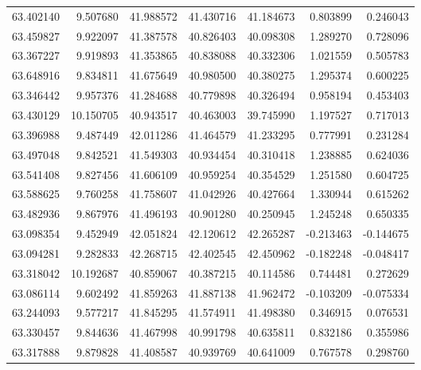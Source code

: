\begin{tabular}{rrrrrrr}
 63.402140 &   9.507680 &         41.988572 &         41.430716 &         41.184673 &  0.803899 &  0.246043 \\
 63.459827 &   9.922097 &         41.387578 &         40.826403 &         40.098308 &  1.289270 &  0.728096 \\
 63.367227 &   9.919893 &         41.353865 &         40.838088 &         40.332306 &  1.021559 &  0.505783 \\
 63.648916 &   9.834811 &         41.675649 &         40.980500 &         40.380275 &  1.295374 &  0.600225 \\
 63.346442 &   9.957376 &         41.284688 &         40.779898 &         40.326494 &  0.958194 &  0.453403 \\
 63.430129 &  10.150705 &         40.943517 &         40.463003 &         39.745990 &  1.197527 &  0.717013 \\
 63.396988 &   9.487449 &         42.011286 &         41.464579 &         41.233295 &  0.777991 &  0.231284 \\
 63.497048 &   9.842521 &         41.549303 &         40.934454 &         40.310418 &  1.238885 &  0.624036 \\
 63.541408 &   9.827456 &         41.606109 &         40.959254 &         40.354529 &  1.251580 &  0.604725 \\
 63.588625 &   9.760258 &         41.758607 &         41.042926 &         40.427664 &  1.330944 &  0.615262 \\
 63.482936 &   9.867976 &         41.496193 &         40.901280 &         40.250945 &  1.245248 &  0.650335 \\
 63.098354 &   9.452949 &         42.051824 &         42.120612 &         42.265287 & -0.213463 & -0.144675 \\
 63.094281 &   9.282833 &         42.268715 &         42.402545 &         42.450962 & -0.182248 & -0.048417 \\
 63.318042 &  10.192687 &         40.859067 &         40.387215 &         40.114586 &  0.744481 &  0.272629 \\
 63.086114 &   9.602492 &         41.859263 &         41.887138 &         41.962472 & -0.103209 & -0.075334 \\
 63.244093 &   9.577217 &         41.845295 &         41.574911 &         41.498380 &  0.346915 &  0.076531 \\
 63.330457 &   9.844636 &         41.467998 &         40.991798 &         40.635811 &  0.832186 &  0.355986 \\
 63.317888 &   9.879828 &         41.408587 &         40.939769 &         40.641009 &  0.767578 &  0.298760 \\

\end{tabular}
